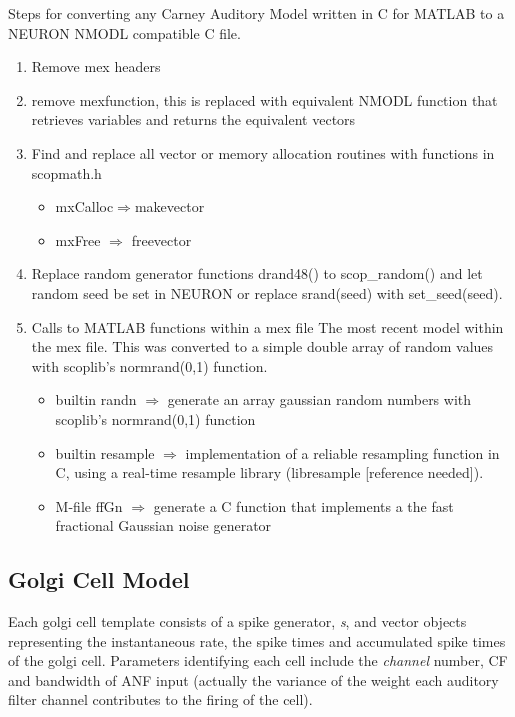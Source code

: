 \begin{appendix}
\medskip{}

Steps for converting any Carney Auditory Model written in C for
MATLAB to a NEURON NMODL compatible C file.  
\begin{enumerate} 
\item Remove mex headers 
\item remove \textsf{mexfunction}, this is
  replaced with equivalent NMODL function that retrieves variables and
  returns the equivalent vectors
\item Find and replace all vector or memory allocation routines with functions
  in scopmath.h
\begin{itemize} 
\item \textsf{mxCalloc}$\Rightarrow$\textsf{makevector}
\item \textsf{mxFree} $\Rightarrow$ \textsf{freevector}
\end{itemize} 
\item Replace random generator functions \textsf{drand48()} to
  \mbox{\textsf{scop\_random()}} and let random seed be set in NEURON or replace \textsf{srand(seed)} with
  \mbox{\textsf{set\_seed(seed)}}. 
\item Calls to MATLAB functions within a mex file The most recent model  within the mex file.  This was
  converted to a simple double array of random values with scoplib's
  \mbox{\textsf{normrand(0,1)}} function.
\begin{itemize}
\item builtin \textsf{randn} $\Rightarrow$ generate an array gaussian random numbers with scoplib's
  \mbox{\textsf{normrand(0,1)}} function
\item builtin \textsf{resample} $\Rightarrow$ implementation of a reliable resampling function in C, using
  a real-time resample library (libresample [reference needed]).
\item M-file \textsf{ffGn} $\Rightarrow$ generate a C function that implements a the fast fractional Gaussian noise generator
\end{itemize}

\end{enumerate}





\subsection{Golgi Cell Model}

Each golgi cell template consists of a spike generator, \emph{s}, and vector
objects representing the instantaneous rate, the spike times and
accumulated  spike times of the golgi cell. Parameters identifying
each cell include the \emph{channel} number, CF and bandwidth of ANF
input (actually the variance of the weight each auditory filter
channel contributes to the firing of the cell).


\end{appendix}
